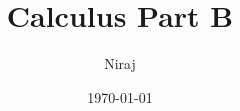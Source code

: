 

\author{Niraj}
\date{\today}

\title{Calculus Part B}


\maketitle

\newpage

\tableofcontents

\newpage







	
